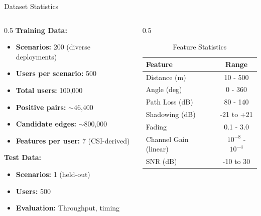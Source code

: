 \documentclass[aspectratio=169]{beamer}
\begin{document}
\begin{frame}{Dataset Statistics}
    \begin{columns}
        \begin{column}{0.5\textwidth}
            \textbf{Training Data:}
            \begin{itemize}
                \item \textbf{Scenarios:} 200 (diverse deployments)
                \item \textbf{Users per scenario:} 500
                \item \textbf{Total users:} 100,000
                \item \textbf{Positive pairs:} $\sim$46,400
                \item \textbf{Candidate edges:} $\sim$800,000
                \item \textbf{Features per user:} 7 (CSI-derived)
            \end{itemize}
            
            \vspace{0.3cm}
            
            \textbf{Test Data:}
            \begin{itemize}
                \item \textbf{Scenarios:} 1 (held-out)
                \item \textbf{Users:} 500
                \item \textbf{Evaluation:} Throughput, timing
            \end{itemize}
        \end{column}
        \begin{column}{0.5\textwidth}
            \begin{table}
                \centering
                \tiny
                \begin{tabular}{lc}
                    \toprule
                    \textbf{Feature} & \textbf{Range} \\
                    \midrule
                    Distance (m) & 10 - 500 \\
                    Angle (deg) & 0 - 360 \\
                    Path Loss (dB) & 80 - 140 \\
                    Shadowing (dB) & -21 to +21 \\
                    Fading & 0.1 - 3.0 \\
                    Channel Gain (linear) & $10^{-8}$ - $10^{-4}$ \\
                    SNR (dB) & -10 to 30 \\
                    \bottomrule
                \end{tabular}
                \caption{Feature Statistics}
            \end{table}
            

\end{column}
\end{columns}
\end{frame}
\end{document}
